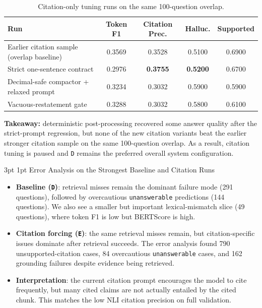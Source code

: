 \documentclass[11pt,letterpaper]{article}
\makeatletter
\renewcommand{\subsection}{\@startsection{subsection}{2}{\z@}%
  {3pt \@plus 1pt}{1pt}%
  {\normalfont\normalsize\itshape}}
\makeatother
\begin{document}
\begin{table}[H]
\centering
\small
\begin{tabular}{@{}lcccc@{}}
\toprule
\textbf{Run} & \textbf{Token F1} & \textbf{Citation Prec.} & \textbf{Halluc.} & \textbf{Supported} \\
\midrule
Earlier citation sample (overlap baseline) & 0.3569 & 0.3528 & 0.5100 & 0.6900 \\
Strict one-sentence contract & 0.2976 & \textbf{0.3755} & \textbf{0.5200} & 0.6700 \\
Decimal-safe compactor + relaxed prompt & 0.3234 & 0.3032 & 0.5900 & 0.5900 \\
Vacuous-restatement gate & 0.3288 & 0.3032 & 0.5800 & 0.6100 \\
\bottomrule
\end{tabular}
\caption{Citation-only tuning runs on the same 100-question overlap.}
\end{table}

\textbf{Takeaway:} deterministic post-processing recovered some answer quality after the strict-prompt regression, but none of the new citation variants beat the earlier stronger citation sample on the same 100-question overlap. As a result, citation tuning is paused and \texttt{D} remains the preferred overall system configuration.

\subsection{Error Analysis on the Strongest Baseline and Citation Runs}

\begin{itemize}
\item \textbf{Baseline (\texttt{D})}: retrieval misses remain the dominant failure mode (291 questions), followed by overcautious \texttt{unanswerable} predictions (144 questions). We also see a smaller but important lexical-mismatch slice (49 questions), where token F1 is low but BERTScore is high.
\item \textbf{Citation forcing (\texttt{E})}: the same retrieval misses remain, but citation-specific issues dominate after retrieval succeeds. The error analysis found 790 unsupported-citation cases, 84 overcautious \texttt{unanswerable} cases, and 162 grounding failures despite evidence being retrieved.
\item \textbf{Interpretation}: the current citation prompt encourages the model to cite frequently, but many cited claims are not actually entailed by the cited chunk. This matches the low NLI citation precision on full validation.
\end{itemize}
\end{document}
